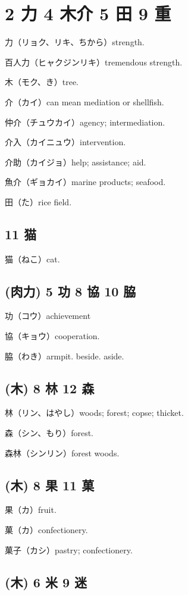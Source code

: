 \section{2 力 4 木介 5 田 9 重}

力（リョク、リキ、ちから）strength.

百人力（ヒャクジンリキ）tremendous strength.

木（モク、き）tree.

介（カイ）can mean mediation or shellfish.

仲介（チュウカイ）agency; intermediation.

介入（カイニュウ）intervention.

介助（カイジョ）help; assistance; aid.

魚介（ギョカイ）marine products; seafood.

田（た）rice field.

\subsection{11 猫}

猫（ねこ）cat.

\subsection{(肉力) 5 功 8 協 10 脇}

功（コウ）achievement

協（キョウ）cooperation.

脇（わき）armpit. beside. aside.

\subsection{(木) 8 林 12 森}

林（リン、はやし）woods; forest; copse; thicket.

森（シン、もり）forest.

森林（シンリン）forest woods.

\subsection{(木) 8 果 11 菓}

果（カ）fruit.

菓（カ）confectionery.

菓子（カシ）pastry; confectionery.

\subsection{(木) 6 米 9 迷}

